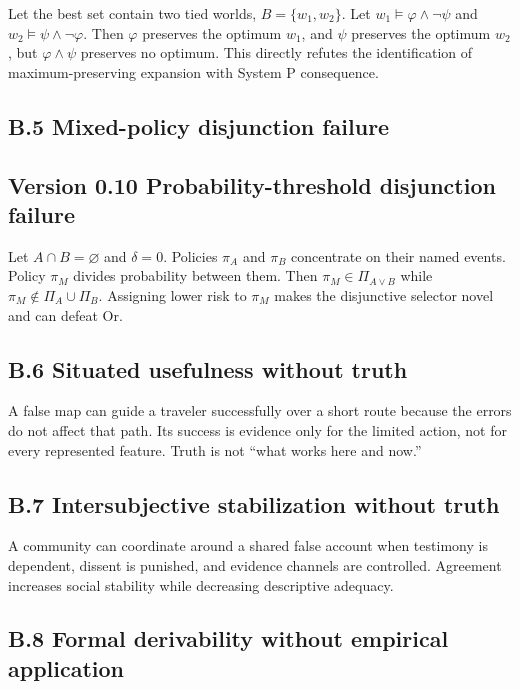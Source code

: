 \documentclass[
  11pt,
]{article}
\begin{document}
Let the best set contain two tied worlds, \(B=\{w_1,w_2\}\). Let
\(w_1\vDash\varphi\land\neg\psi\) and \(w_2\vDash\psi\land\neg\varphi\).
Then \(\varphi\) preserves the optimum \(w_1\), and \(\psi\) preserves
the optimum \(w_2\), but \(\varphi\land\psi\) preserves no optimum. This
directly refutes the identification of maximum-preserving expansion with
System P consequence.

\subsection{B.5 Mixed-policy disjunction
failure}\label{b.5-mixed-policy-disjunction-failure}

\subsection{Version 0.10 Probability-threshold disjunction
failure}\label{version-0.10-probability-threshold-disjunction-failure}

Let \(A\cap B=\varnothing\) and \(\delta=0\). Policies \(\pi_A\) and
\(\pi_B\) concentrate on their named events. Policy \(\pi_M\) divides
probability between them. Then \(\pi_M\in\Pi_{A\lor B}\) while
\(\pi_M\notin\Pi_A\cup\Pi_B\). Assigning lower risk to \(\pi_M\) makes
the disjunctive selector novel and can defeat Or.

\subsection{B.6 Situated usefulness without
truth}\label{b.6-situated-usefulness-without-truth}

A false map can guide a traveler successfully over a short route because
the errors do not affect that path. Its success is evidence only for the
limited action, not for every represented feature. Truth is not ``what
works here and now.''

\subsection{B.7 Intersubjective stabilization without
truth}\label{b.7-intersubjective-stabilization-without-truth}

A community can coordinate around a shared false account when testimony
is dependent, dissent is punished, and evidence channels are controlled.
Agreement increases social stability while decreasing descriptive
adequacy.

\subsection{B.8 Formal derivability without empirical
application}\label{b.8-formal-derivability-without-empirical-application}
\end{document}
